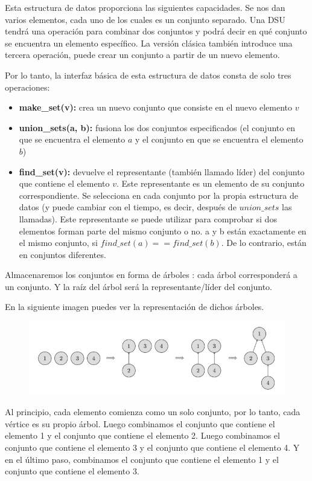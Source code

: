 Esta estructura de datos proporciona las siguientes capacidades. Se nos dan varios elementos, cada uno de los cuales es un conjunto separado. Una DSU tendrá una operación para combinar dos conjuntos y podrá decir en qué conjunto se encuentra un elemento específico. La versión clásica también introduce una tercera operación, puede crear un conjunto a partir de un nuevo elemento.

Por lo tanto, la interfaz básica de esta estructura de datos consta de solo tres operaciones:

\begin{itemize}
	\item \textbf{make\_set(v):} crea un nuevo conjunto que consiste en el nuevo elemento $v$
	\item \textbf{union\_sets(a, b):} fusiona los dos conjuntos especificados (el conjunto en que  se encuentra el elemento $a$ y el conjunto en que se encuentra el elemento $b$)
	\item \textbf{find\_set(v):} devuelve el representante (también llamado líder) del conjunto que contiene el elemento $v$. Este representante es un elemento de su conjunto correspondiente. Se selecciona en cada conjunto por la propia estructura de datos (y puede cambiar con el tiempo, es decir, después de $union\_sets$ las llamadas). Este representante se puede utilizar para comprobar si dos elementos forman parte del mismo conjunto o no. a y b están exactamente en el mismo conjunto, si $find\_set(a) == find\_set(b)$. De lo contrario, están en conjuntos diferentes.
\end{itemize}

Almacenaremos los conjuntos en forma de árboles : cada árbol corresponderá a un conjunto. Y la raíz del árbol será la representante/líder del conjunto.

En la siguiente imagen puedes ver la representación de dichos árboles.

\begin{figure}[h!]
	\centering
	\includegraphics[width=0.7\linewidth]{img/DSU_example}
	\label{fig:dsuexample}
\end{figure}

Al principio, cada elemento comienza como un solo conjunto, por lo tanto, cada vértice es su propio árbol. Luego combinamos el conjunto que contiene el elemento 1 y el conjunto que contiene el elemento 2. Luego combinamos el conjunto que contiene el elemento 3 y el conjunto que contiene el elemento 4. Y en el último paso, combinamos el conjunto que contiene el elemento 1 y el conjunto que contiene el elemento 3.

